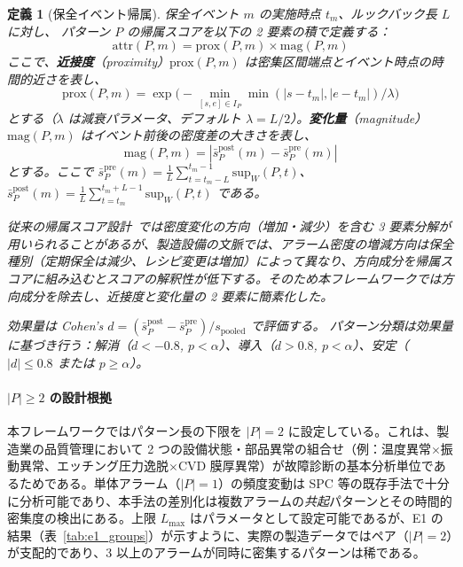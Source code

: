 \documentclass[11pt]{article}
\newtheorem{definition}{定義}
\begin{document}
\begin{definition}[保全イベント帰属]
\label{def:attribution}
保全イベント $m$ の実施時点 $t_m$、ルックバック長 $L$ に対し、
パターン $P$ の帰属スコアを以下の 2 要素の積で定義する：
\begin{equation}
\mathrm{attr}(P, m) = \mathrm{prox}(P, m) \times \mathrm{mag}(P, m)
\end{equation}
ここで、\textbf{近接度}（proximity）$\mathrm{prox}(P, m)$ は密集区間端点とイベント時点の時間的近さを表し、
\begin{equation}
\mathrm{prox}(P, m) = \exp\bigl(-\min_{[s,e] \in I_P} \min(|s - t_m|, |e - t_m|) / \lambda\bigr)
\end{equation}
とする（$\lambda$ は減衰パラメータ、デフォルト $\lambda = L/2$）。\textbf{変化量}（magnitude）$\mathrm{mag}(P, m)$ はイベント前後の密度差の大きさを表し、
\begin{equation}
\mathrm{mag}(P, m) = |\bar{s}_P^{\mathrm{post}}(m) - \bar{s}_P^{\mathrm{pre}}(m)|
\end{equation}
とする。ここで $\bar{s}_P^{\mathrm{pre}}(m) = \frac{1}{L} \sum_{t=t_m-L}^{t_m-1} \mathrm{sup}_W(P, t)$、
$\bar{s}_P^{\mathrm{post}}(m) = \frac{1}{L} \sum_{t=t_m}^{t_m+L-1} \mathrm{sup}_W(P, t)$ である。

従来の帰属スコア設計~\citep{lancaster2018surrogate}では密度変化の方向（増加・減少）を含む 3 要素分解が用いられることがあるが、製造設備の文脈では、アラーム密度の増減方向は保全種別（定期保全は減少、レシピ変更は増加）によって異なり、方向成分を帰属スコアに組み込むとスコアの解釈性が低下する。そのため本フレームワークでは方向成分を除去し、近接度と変化量の 2 要素に簡素化した。

効果量は Cohen's $d = (\bar{s}_P^{\mathrm{post}} - \bar{s}_P^{\mathrm{pre}}) / s_{\mathrm{pooled}}$ で評価する。
パターン分類は効果量に基づき行う：\emph{解消}（$d < -0.8$, $p < \alpha$）、\emph{導入}（$d > 0.8$, $p < \alpha$）、\emph{安定}（$|d| \leq 0.8$ または $p \geq \alpha$）。
\end{definition}

\paragraph{$|P| \geq 2$ の設計根拠}
本フレームワークではパターン長の下限を $|P| = 2$ に設定している。これは、製造業の品質管理において 2 つの設備状態・部品異常の組合せ（例：温度異常$\times$振動異常、エッチング圧力逸脱$\times$CVD 膜厚異常）が故障診断の基本分析単位であるためである。単体アラーム（$|P|=1$）の頻度変動は SPC 等の既存手法で十分に分析可能であり、本手法の差別化は複数アラームの\emph{共起}パターンとその時間的密集度の検出にある。上限 $L_{\max}$ はパラメータとして設定可能であるが、E1 の結果（表~\ref{tab:e1_groups}）が示すように、実際の製造データではペア（$|P|=2$）が支配的であり、3 以上のアラームが同時に密集するパターンは稀である。
\end{document}
